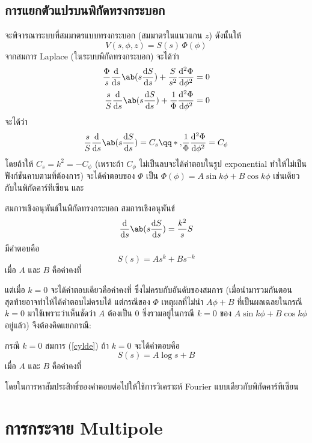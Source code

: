 \subsection{การแยกตัวแปรบนพิกัดทรงกระบอก}
จะพิจารณาระบบที่สมมาตรแบบทรงกระบอก (สมมาตรในแนวแกน $z$) ดังนั้นให้
\[V(s,\phi,z)=S(s)\,\Phi(\phi)\]
จากสมการ Laplace (ในระบบพิกัดทรงกระบอก) จะได้ว่า
\begin{align*}
    \frac{\Phi}{s}\odv{}{s}\ab(s\odv{S}{s})+\frac{S}{s^2}\odv[2]{\Phi}{\phi}&=0\\
    \frac{s}{S}\odv{}{s}\ab(s\odv{S}{s})+\frac{1}{\Phi}\odv[2]{\Phi}{\phi}&=0
\end{align*}
จะได้ว่า
\[\frac{s}{S}\odv{}{s}\ab(s\odv{S}{s})=C_s\qq*{,}\frac{1}{\Phi}\odv[2]{\Phi}{\phi}=C_\phi\]
โดยถ้าให้ $C_s=k^2=-C_\phi$ (เพราะถ้า $C_\phi$ ไม่เป็นลบจะได้คำตอบในรูป exponential ทำให้ไม่เป็นฟังก์ชันคาบตามที่ต้องการ) จะได้คำตอบของ $\Phi$ เป็น $\Phi(\phi)=A\sin k\phi+B\cos k\phi$ เช่นเดียวกับในพิกัดคาร์ทีเซียน และ
\begin{lawbox}{สมการเชิงอนุพันธ์ในพิกัดทรงกระบอก}
    สมการเชิงอนุพันธ์
    \begin{equation}
    \odv{}{s}\ab(s\odv{S}{s})=\frac{k^2}{s}S\label{cylde}
    \end{equation}
    มีคำตอบคือ
    \begin{equation}
        S(s)=As^k+Bs^{-k}
    \end{equation}
    เมื่อ $A$ และ $B$ คือค่าคงที่
\end{lawbox}
แต่เมื่อ $k=0$ จะได้คำตอบเดียวคือค่าคงที่ ซึ่งไม่ครบกับอันดับของสมการ (เมื่อนำมารวมกันตอนสุดท้ายอาจทำให้ได้คำตอบไม่ครบได้ แต่กรณีของ $\Phi$ เหตุผลที่ไม่นำ $A\phi+B$ ที่เป็นผลเฉลยในกรณี $k=0$ มาใช้เพราะว่าเห็นชัดว่า $A$ ต้องเป็น $0$ ซึ่งรวมอยู่ในกรณี $k=0$ ของ $A\sin k\phi + B\cos k\phi$ อยู่แล้ว) จึงต้องคิดแยกกรณี:
\begin{lawbox}{กรณี $k=0$}
    สมการ (\ref{cylde}) ถ้า $k=0$ จะได้คำตอบคือ
    \begin{equation}
        S(s)=A\log s+B
    \end{equation}
    เมื่อ $A$ และ $B$ คือค่าคงที่
\end{lawbox}
โดยในการหาสัมประสิทธิ์ของคำตอบต่อไปให้ใช้การวิเคราะห์ Fourier แบบเดียวกับพิกัดคาร์ทีเซียน

\section{การกระจาย Multipole}

